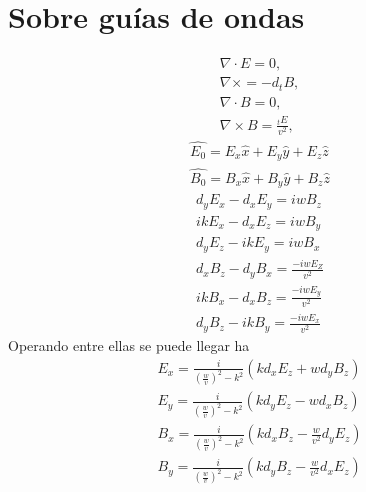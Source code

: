 \chapter{Sobre guías de ondas}

\begin{subequations}\label{Maxwell}
	\begin{align}
	\nabla \cdot E = 0,\label{Primera}\\
	\nabla \times = - d_{t} B,\label{segunda}\\
	\nabla \cdot B = 0,\label{tercera}\\
	\nabla \times B=  \frac{_{t} E}{v^2},\label{cuarta}
	\end{align}
\end{subequations}
\begin{subequations}\label{Camposincidentes}
	\begin{align}
\hat{E_{0}} = E_{x}\hat{x} + E_{y}\hat{y}+E_{z}\hat{z} \\
\hat{B_{0}} = B_{x}\hat{x} + B_{y}\hat{y}+B_{z}\hat{z}
	\end{align}
\end{subequations}
\begin{subequations}\label{Camposexplicitos}
	\begin{align}
d_{y}E_{x}-d_{x}E_{y}= i w B_{z} \\
i k E_{x}-d_{x}E_{z}= i w B_{y} \\
d_{y}E_{z}-i k E_{y}= i w B_{x} \\
d_{x}B_{z}-d_{y}B_{x}= \frac{-iw E_{Z} }{v^2} \\
i k B_{x}-d_{x}B_{z}= \frac{-iw E_{y} }{v^2} \\
d_{y}B_{z}- i k B_{y}= \frac{-iw E_{x} }{v^2} 
	\end{align}
\end{subequations}
Operando entre ellas se puede llegar ha
\begin{subequations}\label{Ecuacionesdecampo}
	\begin{align}
	E_{x} = \frac{i}{(\frac{w}{v})^2 - k^2} (k d_{x}E_{z}+w d_{y} B_{z}) \\
	E_{y} = \frac{i}{(\frac{w}{v})^2 - k^2} (k d_{y}E_{z}-w d_{x} B_{z}) \\
	B_{x} = \frac{i}{(\frac{w}{v})^2 - k^2} (k d_{x}B_{z}- \frac{w}{v^2} d_{y} E_{z}) \\
	B_{y} = \frac{i}{(\frac{w}{v})^2 - k^2} (k d_{y}B_{z}- \frac{w}{v^2} d_{x} E_{z}) 
	\end{align}
\end{subequations}
